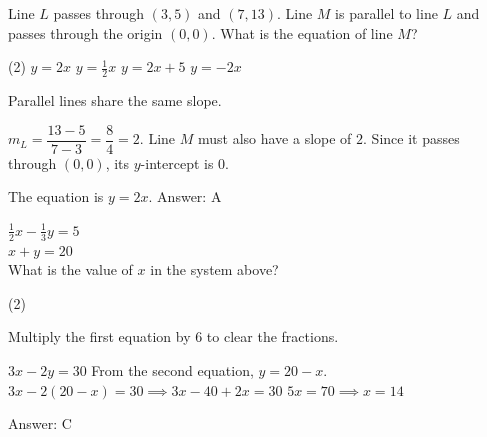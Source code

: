 \documentclass[11pt,paper=a4,answers]{exam}
\begin{document}
\begin{questions}
\vspace{1cm}

\question
Line $L$ passes through $(3, 5)$ and $(7, 13)$. Line $M$ is parallel to line $L$ and passes through the origin $(0, 0)$. What is the equation of line $M$?
\begin{tasks}(2)
\task $y = 2x$
\task $y = \frac{1}{2}x$
\task $y = 2x + 5$
\task $y = -2x$
\end{tasks}

\begin{solution}
Parallel lines share the same slope.
\vspace{5pt}
\begin{center}
$m_L = \dfrac{13 - 5}{7 - 3} = \dfrac{8}{4} = 2$.
\vspace{5pt}
Line $M$ must also have a slope of $2$.
\vspace{5pt}
Since it passes through $(0, 0)$, its $y$-intercept is $0$.
\end{center}
\vspace{5pt}
The equation is $y = 2x$.
\vspace{5pt}
Answer: \colorbox{yellow!100}{A}
\end{solution}

\vspace{1cm}

\question
$\frac{1}{2}x - \frac{1}{3}y = 5$ \\
$x + y = 20$ \\
What is the value of $x$ in the system above?
\begin{tasks}(2)
   
\end{tasks}

\begin{solution}
Multiply the first equation by 6 to clear the fractions.
\vspace{5pt}
\begin{center}
$3x - 2y = 30$
\vspace{5pt}
From the second equation, $y = 20 - x$.
\vspace{5pt}
$3x - 2(20 - x) = 30 \implies 3x - 40 + 2x = 30$
\vspace{5pt}
$5x = 70 \implies x = 14$
\end{center}
\vspace{5pt}
Answer: \colorbox{yellow!100}{C}
\end{solution}

\vspace{1cm}


\end{questions}
\end{document}

